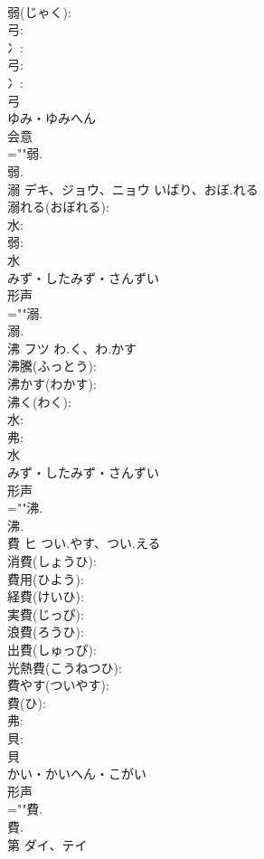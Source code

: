 \documentclass[8pt]{extreport}
\begin{document}
\begin{CJK}{UTF8}{min}
\\	弱(じゃく): 
\\	弓: 
\\	冫: 
\\	弓: 
\\	冫: 
\\	弓	
\\	ゆみ・ゆみへん	
\\	会意 
\\	=""弱.
\\	弱.
\\	溺	デキ、ジョウ、ニョウ	いばり、おぼ.れる		
\\	溺れる(おぼれる): 
\\	水: 
\\	弱: 
\\	水	
\\	みず・したみず・さんずい	
\\	形声 
\\	=""溺.
\\	溺.
\\	沸	フツ	わ.く、わ.かす		
\\	沸騰(ふっとう): 
\\	沸かす(わかす): 
\\	沸く(わく): 
\\	水: 
\\	弗: 
\\	水	
\\	みず・したみず・さんずい	
\\	形声 
\\	=""沸.
\\	沸.
\\	費	ヒ	つい.やす、つい.える		
\\	消費(しょうひ): 
\\	費用(ひよう): 
\\	経費(けいひ): 
\\	実費(じっぴ): 
\\	浪費(ろうひ): 
\\	出費(しゅっぴ): 
\\	光熱費(こうねつひ): 
\\	費やす(ついやす): 
\\	費(ひ): 
\\	弗: 
\\	貝: 
\\	貝	
\\	かい・かいへん・こがい	
\\	形声 
\\	=""費.
\\	費.
\\	第	ダイ、テイ			

\end{CJK}
\end{document}
